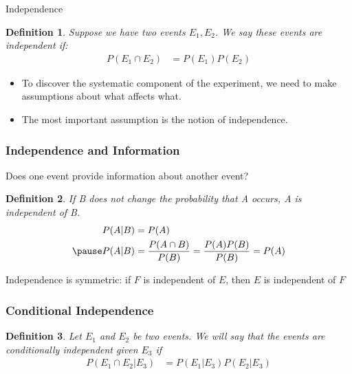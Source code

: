 \documentclass[aspectratio=169, handout]{beamer}
\newtheorem{defn}{Definition}
\numberwithin{equation}{section}
\begin{document}
\begin{frame}{Independence}

\begin{defn}
Suppose we have two events $E_{1}, E_{2}$.  We say these events are \alert{independent} if:
\begin{align*}
P(E_{1}\cap E_{2}) &= P(E_{1}) P( E_{2})
\end{align*}
\end{defn}
\begin{itemize}
\item To discover the systematic component of the experiment, we need to make assumptions about what affects what.\pause
\item The most important assumption is the notion of independence.
\end{itemize}
\end{frame}



\begin{frame}
\frametitle{Independence and Information} 

Does one event provide \alert{information} about another event? \pause 

\begin{defn} 
If B does not change the probability that A occurs, A is independent of B.
\begin{align*}
P(A|B)&=P(A)\\ \pause
 P(A|B)&=\frac{P(A\cap B)}{P(B)}=\frac{P(A)P(B)}{P(B)}=P(A)
 \end{align*}
\end{defn}
\pause

Independence is symmetric: if $F$ is independent of $E$, then
  $E$ is independent of $F$

\end{frame}


\begin{frame}
\frametitle{Conditional Independence}

\begin{defn}
Let $E_{1}$ and $E_{2}$ be two events.  We will say that the events are conditionally independent given $E_{3}$ if 
\begin{align*}
P(E_{1} \cap E_{2} | E_{3}) &= P(E_{1} | E_{3} ) P(E_{2} | E_{3} ) 
\end{align*}
\end{defn}

\end{frame}
\end{document}
